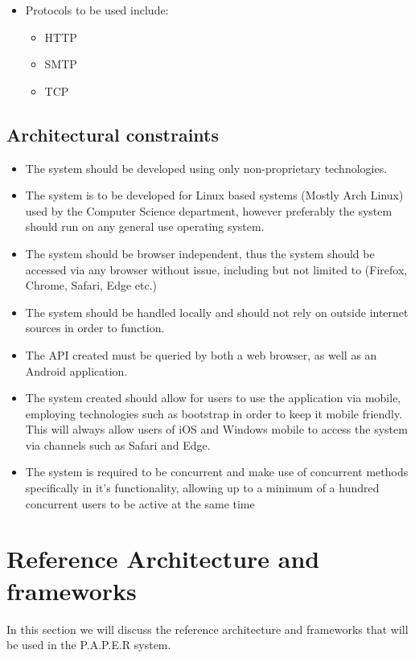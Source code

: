 \documentclass{article}
\begin{document}
	
	\begin{itemize}
		\item Protocols to be used include:
		\begin{itemize}
			\item HTTP
			\item SMTP
			\item TCP
		\end{itemize}
	\end{itemize}
	
	\cleardoublepage
	
	\subsection{Architectural constraints}\label{subsec:constraints}
	\begin{itemize}
		\item The system should be developed using only non-proprietary technologies.
		\item The system is to be developed for Linux based systems (Mostly Arch Linux) used by the Computer Science department, however preferably the system should run on any general use operating system.
		\item The system should be browser independent, thus the system should be accessed via any browser without issue, including but not limited to (Firefox, Chrome, Safari, Edge etc.)
		\item The system should be handled locally and should not rely on outside internet sources in order to function.
		\item The API created must be queried by both a web browser, as well as an Android application.
		\item The system created should allow for users to use the application via mobile, employing technologies such as bootstrap in order to keep it mobile friendly. This will always allow users of iOS and Windows mobile to access the system via channels such as Safari and Edge.
		\item The system is required to be concurrent and make use of concurrent methods specifically in it's functionality, allowing up to a minimum of a hundred concurrent users to be active at the same time
	\end{itemize}

	\section{Reference Architecture and frameworks}\label{sec: ReferencArchitecture}
In this section we will discuss the reference architecture and frameworks that will be used in the P.A.P.E.R system.
\end{document}
